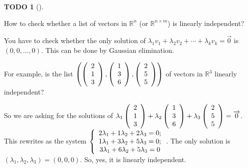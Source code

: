 \documentclass[numbers=enddot,12pt,final,onecolumn,notitlepage]{scrartcl}%
\theoremstyle{definition}
\newtheorem{quest}[theo]{TODO}
\newenvironment{todo}[1][]
{\begin{quest}[#1]\begin{leftbar}}
{\end{leftbar}\end{quest}}
\begin{document}
\begin{todo}
How to check whether a list of vectors in $\mathbb{R}^{n}$ (or $\mathbb{R}%
^{n\times m}$) is linearly independent?

You have to check whether the only solution of $\lambda_{1}v_{1}+\lambda
_{2}v_{2}+\cdots+\lambda_{k}v_{k}=\overrightarrow{0}$ is $\left(
0,0,\ldots,0\right)  $. This can be done by Gaussian elimination.

For example, is the list $\left(  \left(
\begin{array}
[c]{c}%
2\\
1\\
3
\end{array}
\right)  ,\left(
\begin{array}
[c]{c}%
1\\
3\\
6
\end{array}
\right)  ,\left(
\begin{array}
[c]{c}%
2\\
5\\
5
\end{array}
\right)  \right)  $ of vectors in $\mathbb{R}^{3}$ linearly independent?

So we are asking for the solutions of $\lambda_{1}\left(
\begin{array}
[c]{c}%
2\\
1\\
3
\end{array}
\right)  +\lambda_{2}\left(
\begin{array}
[c]{c}%
1\\
3\\
6
\end{array}
\right)  +\lambda_{3}\left(
\begin{array}
[c]{c}%
2\\
5\\
5
\end{array}
\right)  =\overrightarrow{0}$. This rewrites as the system $\left\{
\begin{array}
[c]{c}%
2\lambda_{1}+1\lambda_{2}+2\lambda_{3}=0;\\
1\lambda_{1}+3\lambda_{2}+5\lambda_{3}=0;\\
3\lambda_{1}+6\lambda_{2}+5\lambda_{3}=0
\end{array}
\right.  $. The only solution is $\left(  \lambda_{1},\lambda_{2},\lambda
_{3}\right)  =\left(  0,0,0\right)  $. So, yes, it is linearly independent.
\end{todo}
\end{document}
